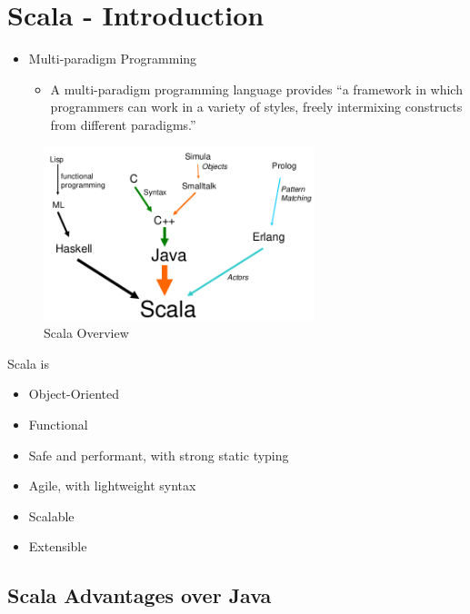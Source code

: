 \hypertarget{scala}{%
\section{Scala - Introduction}\label{scala}}

\begin{itemize}
\tightlist
\item
  Multi-paradigm Programming

  \begin{itemize}
  \tightlist
  \item
    A multi-paradigm programming language provides ``a framework in
    which programmers can work in a variety of styles, freely
    intermixing constructs from different paradigms.''
  \end{itemize}
\end{itemize}

\begin{figure}[H]
\centering
\includegraphics[width=0.7\textwidth]{figures/scalaOverview.png}
\caption{Scala Overview}
\end{figure}

Scala is

\begin{itemize}
\tightlist
\item
  Object-Oriented
\item
  Functional
\item
  Safe and performant, with strong static typing
\item
  Agile, with lightweight syntax
\item
  Scalable
\item
  Extensible
\end{itemize}

\clearpage
\hypertarget{scala-advantages-over-java}{%
\subsection{Scala Advantages over
Java}\label{scala-advantages-over-java}}

